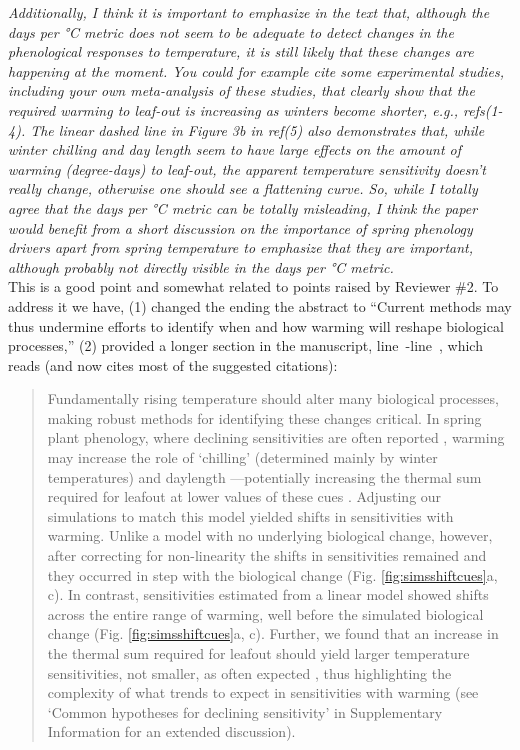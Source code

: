 \documentclass[11pt,letter]{article}
\newcommand{\lr}[1]{line~\lineref{#1}}
\begin{document}
\emph{Additionally, I think it is important to emphasize in the text that, although the days per °C metric does not seem to be adequate to detect changes in the phenological responses to temperature, it is still likely that these changes are happening at the moment. You could for example cite some experimental studies, including your own meta-analysis of these studies, that clearly show that the required warming to leaf-out is increasing as winters become shorter, e.g., refs(1-4). The linear dashed line in Figure 3b in ref(5) also demonstrates that, while winter chilling and day length seem to have large effects on the amount of warming (degree-days) to leaf-out, the apparent temperature sensitivity doesn't really change, otherwise one should see a flattening curve. So, while I totally agree that the days per °C metric can be totally misleading, I think the paper would benefit from a short discussion on the importance of spring phenology drivers apart from spring temperature to
emphasize that they are important, although probably not directly visible in the days per °C metric.}\\

This is a good point and somewhat related to points raised by Reviewer \#2. To address it we have, (1) changed the ending the abstract to ``Current methods may thus undermine efforts to identify when and how warming will reshape biological processes,'' (2) provided a longer section in the manuscript, \lr{biomattersstart}-\lr{biomattersend}, which reads (and now cites most of the suggested citations):

\begin{quote}
Fundamentally rising temperature should alter many biological processes, making robust methods for identifying these changes critical. In spring plant phenology, where declining sensitivities are often reported \citep{fu2015,piao2017,dai2019ag}, warming may increase the role of `chilling' (determined mainly by winter temperatures) and daylength \citep{Laube:2014a,zohner2016}---potentially increasing the thermal sum required for leafout at lower values of these cues \citep{Polgar2014,zohner2017,flynn2018}. Adjusting our simulations to match this model yielded shifts in sensitivities with warming. Unlike a model with no underlying biological change, however, after correcting for non-linearity the shifts in sensitivities remained and they occurred in step with the biological change (Fig. \ref{fig:simsshiftcues}a, c). In contrast, sensitivities estimated from a linear model showed shifts across the entire range of warming, well before the simulated biological change (Fig. \ref{fig:simsshiftcues}a, c). Further, we found that an increase in the thermal sum required for leafout should yield larger temperature sensitivities, not smaller, as often expected \citep[e.g.,][]{fu2015}, thus highlighting the complexity of what trends to expect in sensitivities with warming (see `Common hypotheses for declining sensitivity' in Supplementary Information for an extended discussion).
\end{quote}
\end{document}
